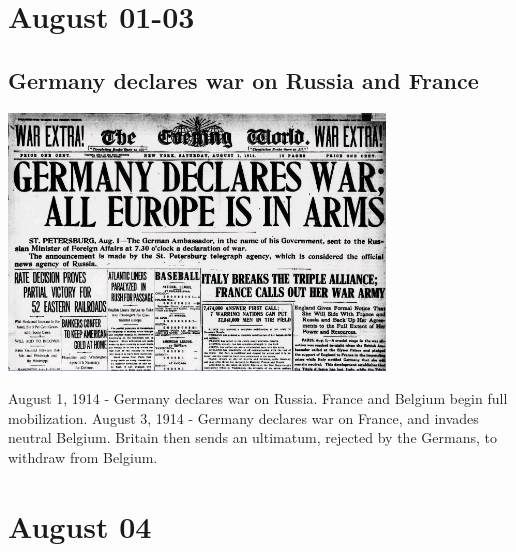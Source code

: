 \documentclass[11pt]{report}
\begin{document}
\section{August 01-03}
\subsection{Germany declares war on Russia and France}
\vspace{2mm}\begin{center}\includegraphics[width=10cm]{./img/germanyWarDeclaration.jpg}\end{center}
August 1, 1914 - Germany declares war on Russia. France and Belgium begin full mobilization. August 3, 1914 - Germany declares war on France, and invades neutral Belgium. Britain then sends an ultimatum, rejected by the Germans, to withdraw from Belgium.

\section{August 04}
\end{document}
